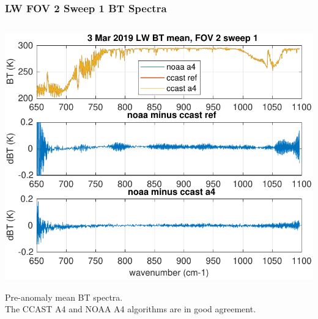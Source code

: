 \documentclass[10pt]{beamer}
\begin{document}
\begin{frame}
\begin{columns}[t]
\begin{column}{0.5\textwidth}
\end{column}
\end{columns}
\end{frame}
\begin{frame}
\frametitle{LW FOV 2 Sweep 1 BT Spectra}
\begin{columns}[t]
\begin{column}{0.5\textwidth}
  \begin{centering}
  \includegraphics[width=\textwidth]{figures/LW_pre_fail_BT_fov2_sd1.pdf}
  \end{centering}\vspace{3mm}
  Pre-anomaly mean BT spectra.  \\The CCAST A4 and NOAA A4 algorithms
  are in good agreement.


\end{column}
\end{columns}
\end{frame}
\end{document}
